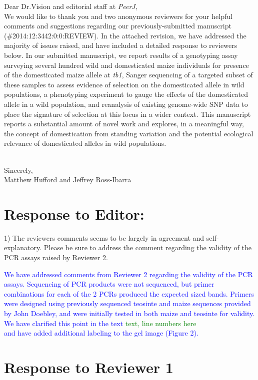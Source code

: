 \documentclass[11pt]{article}
\newcommand{\res}[1]{\noindent \textcolor{blue}{{#1}} \\}
\newcommand{\lev}[1]{\noindent \textcolor{green}{{#1}} \\}
\begin{document}
\noindent Dear Dr.Vision and editorial staff at \emph{PeerJ}, \\

We would like to thank you and two anonymous reviewers for your helpful comments and suggestions regarding our previously-submitted manuscript (\#2014:12:3442:0:0:REVIEW).  In the attached revision, we have addressed the majority of issues raised, and have included a detailed response to reviewers below.  In our submitted manuscript, we report results of a genotyping assay surveying several hundred wild and domesticated maize individuals for presence of the domesticated maize allele at \emph{tb1}, Sanger sequencing of a targeted subset of these samples to assess evidence of selection on the domesticated allele in wild populations, a phenotyping experiment to gauge the effects of the domesticated allele in a wild population, and reanalysis of existing genome-wide SNP data to place the signature of selection at this locus in a wider context.  This manuscript reports a substantial amount of novel work and explores, in a meaningful way, the concept of domestication from standing variation and the potential ecological relevance of domesticated alleles in wild populations.\\\

\noindent Sincerely,\\

\noindent Matthew Hufford and Jeffrey Ross-Ibarra

\section*{Response to Editor:}

1) The reviewers comments seems to be largely in agreement and self-explanatory. Please be sure to address the comment regarding the validity of the PCR assays raised by Reviewer 2.

\res{We have addressed comments from Reviewer 2 regarding the validity of the PCR assays. Sequencing of PCR products were not sequenced, but primer combinations for each of the 2 PCRs produced the expected sized bands. Primers were designed using previously sequenced teosinte and maize sequences provided by John Doebley, and were initially tested in both maize and teosinte for validity.  We have clarified this point in the text \lev{text, line numbers here} and have added additional labeling to the gel image (Figure 2).} 

\section*{Response to Reviewer 1}
\end{document}
